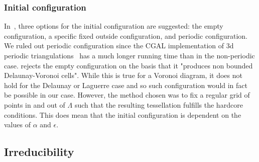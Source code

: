 \subsubsection{Initial configuration}
In~\cite{DereudreLavancier2010}, three options for the initial configuration are suggested: the empty configuration, a specific fixed outside configuration, and periodic configuration.
We ruled out periodic configuration since the CGAL implementation of 3d periodic triangulations~\cite{cgal:3d-period} has a much longer running time than in the non-periodic case. 
\cite{DereudreLavancier2010} rejects the empty configuration on the basis that it "produces non bounded Delaunay-Voronoi cells". While this is true for a Voronoi diagram, it does not hold for the Delaunay or Laguerre case and so such configuration would in fact be possible in our case.
However, the method chosen was to fix a regular grid of points in and out of $\Lambda$ such that the resulting tessellation fulfills the hardcore conditions. This does mean that the initial configuration is dependent on the values of $\alpha$ and $\epsilon$. 


\subsection{Irreducibility}
\tbd

